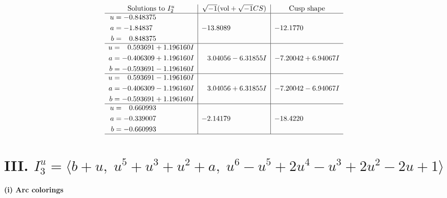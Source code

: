 \documentclass[1p]{elsarticle_modified}
\theoremstyle{definition}
\newcommand{\I}{\sqrt{-1}}
\begin{document}
$$\begin{array}{c|c|c}  
\text{Solutions to }I^u_{2}& \I (\text{vol} + \sqrt{-1}CS) & \text{Cusp shape}\\
 \hline 
\begin{aligned}
u &= -0.848375\phantom{ +0.000000I} \\
a &= -1.84837\phantom{ +0.000000I} \\
b &= \phantom{-}0.848375\phantom{ +0.000000I}\end{aligned}
 & -13.8089\phantom{ +0.000000I} & -12.1770\phantom{ +0.000000I} \\ \hline\begin{aligned}
u &= \phantom{-}0.593691 + 1.196160 I \\
a &= -0.406309 + 1.196160 I \\
b &= -0.593691 - 1.196160 I\end{aligned}
 & \phantom{-}3.04056 - 6.31855 I & -7.20042 + 6.94067 I \\ \hline\begin{aligned}
u &= \phantom{-}0.593691 - 1.196160 I \\
a &= -0.406309 - 1.196160 I \\
b &= -0.593691 + 1.196160 I\end{aligned}
 & \phantom{-}3.04056 + 6.31855 I & -7.20042 - 6.94067 I \\ \hline\begin{aligned}
u &= \phantom{-}0.660993\phantom{ +0.000000I} \\
a &= -0.339007\phantom{ +0.000000I} \\
b &= -0.660993\phantom{ +0.000000I}\end{aligned}
 & -2.14179\phantom{ +0.000000I} & -18.4220\phantom{ +0.000000I}\\
 \hline 
 \end{array}$$\newpage\newpage\renewcommand{\arraystretch}{1}
\centering \section*{III. $I^u_{3}= \langle b+u,\;u^5+u^3+u^2+a,\;u^6- u^5+2 u^4- u^3+2 u^2-2 u+1 \rangle$}
\flushleft \textbf{(i) Arc colorings}\\
\end{document}
